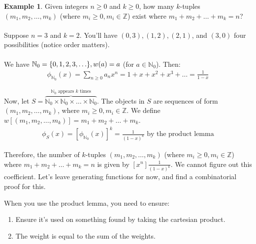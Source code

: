 \documentclass[]{article}
\theoremstyle{definition}
\newtheorem{ex}{Example}[section]
\DeclarePairedDelimiter{\set}{\lbrace}{\rbrace}
\begin{document}
				\begin{ex}
					Given integers $n \ge 0$ and $k \ge 0$, how many $k$-tuples $(m_1, m_2, \ldots, m_k)$ (where $m_i \ge 0, m_i \in \mathbb{Z}$) exist where $m_1 + m_2 + \ldots + m_k = n$?
					\\ \\
					Suppose $n = 3$ and $k = 2$. You'll have $(0, 3), (1, 2), (2, 1)$, and $(3, 0)$ \textendash{} four possibilities (notice order matters).
					\\ \\
					We have $\mathbb{N}_0 = \set{0, 1, 2, 3, \ldots }, w(a) = a$ (for $a \in \mathbb{N}_0$). Then:
					\begin{align*}
						\phi_{\mathbb{N}_0}(x) = \sum_{n \ge 0} a_n x^n = 1 + x + x^2 + x^3 + \ldots = \frac{1}{1-x}
					\end{align*}

					Now, let $S = \overbrace{\mathbb{N}_0 \times \mathbb{N}_0 \times \ldots \times \mathbb{N}_0}^{\mathbb{N}_0 \text{ appears } k \text{ times}}$. The objects in $S$ are sequences of form $(m_1, m_2, \ldots, m_k)$, where $m_i \ge 0, m_i \in \mathbb{Z}$. We define $w[(m_1, m_2, \ldots, m_k)] = m_1 + m_2 + \ldots + m_k$.
					\begin{align*}
						\phi_S(x) = [\phi_{\mathbb{N}_0}(x)]^k = \frac{1}{(1-x)^k} \text{ by the product lemma}
					\end{align*}

					Therefore, the number of $k$-tuples $(m_1, m_2, \ldots, m_k)$ (where $m_i \ge 0, m_i \in \mathbb{Z}$) where $m_1 + m_2 + \ldots + m_k = n$ is given by $[x^n]\frac{1}{(1 - x)^k}$. We cannot figure out this coefficient. Let's leave generating functions for now, and find a combinatorial proof for this.
				\end{ex}

				When you use the product lemma, you need to ensure:
				\begin{enumerate}
					\item Ensure it's used on something found by taking the cartesian product.
					\item The weight is equal to the sum of the weights.
				\end{enumerate}
\end{document}
